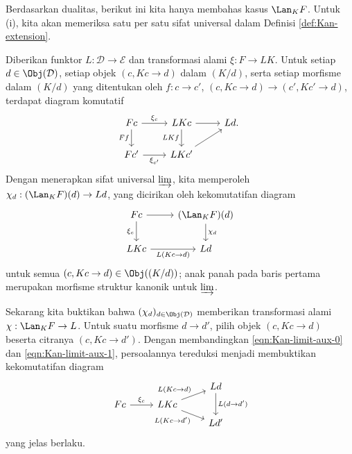 \begin{bukti}
	Berdasarkan dualitas, berikut ini kita hanya membahas kasus $\Lan_K F$.
	Untuk (i), kita akan memeriksa satu per satu sifat universal dalam
	Definisi \ref{def:Kan-extension}.

	Diberikan funktor $L: \mathcal{D} \to \mathcal{E}$ dan transformasi alami
	$\xi: F \to LK$. Untuk setiap $d \in \Obj(\mathcal{D})$, setiap objek
	$(c, Kc \to d)$ dalam $(K/d)$, serta setiap morfisme dalam $(K/d)$ yang
	ditentukan oleh $f: c \to c'$,
	$(c, Kc \to d) \to (c', Kc' \to d)$, terdapat diagram komutatif
	\[\begin{tikzcd}
		Fc \arrow[r, "\xi_c"] \arrow[d, "Ff"'] & LKc \arrow[d, "LKf"'] \arrow[r] & Ld . \\
		Fc' \arrow[r, "{\xi_{c'}}"'] & LKc' \arrow[ru] &
	\end{tikzcd}\]
	Dengan menerapkan sifat universal $\varinjlim$, kita memperoleh
	$\chi_d: (\Lan_K F)(d) \to Ld$, yang dicirikan oleh kekomutatifan diagram
	\begin{equation}\label{eqn:Kan-limit-aux-1}
	\begin{tikzcd}
		Fc \arrow[r] \arrow[d, "\xi_c"'] & (\Lan_K F)(d) \arrow[d, "\chi_d"] \\
		LKc \arrow[r, "{L(Kc \to d)}"'] & Ld
	\end{tikzcd}\end{equation}
	untuk semua $(c, Kc \to d) \in \Obj((K/d))$; anak panah pada baris pertama
	merupakan morfisme struktur kanonik untuk $\varinjlim$.

	Sekarang kita buktikan bahwa $(\chi_d)_{d \in \Obj(\mathcal{D})}$
	memberikan transformasi alami $\chi: \Lan_K F \to L$. Untuk suatu morfisme
	$d \to d'$, pilih objek $(c, Kc \to d)$ beserta citranya
	$(c, Kc \to d')$. Dengan membandingkan
	\eqref{eqn:Kan-limit-aux-0} dan \eqref{eqn:Kan-limit-aux-1}, persoalannya
	tereduksi menjadi membuktikan kekomutatifan diagram
	\[\begin{tikzcd}[row sep=tiny]
		& & Ld \arrow[dd, "{L(d \to d')}"] \\
		Fc \arrow[r, "\xi_c"] & LKc \arrow[ru, "{L(Kc \to d)}"] \arrow[rd, "{L(Kc \to d')}"'] & \\
		& & Ld'
	\end{tikzcd}\]
	yang jelas berlaku.


\end{bukti}
